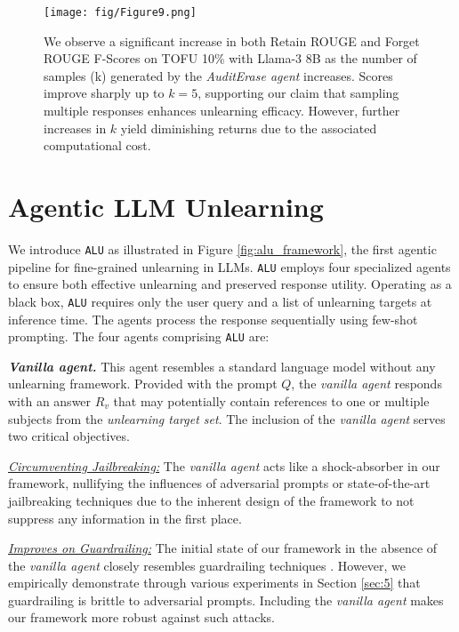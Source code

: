 
\begin{figure}[t]
    \centering
    \texttt{[image: fig/Figure9.png]}
    \caption{We observe a significant increase in both Retain ROUGE and Forget ROUGE F-Scores on TOFU 10\% with Llama-3 8B as the number of samples (k) generated by the \emph{AuditErase agent} increases. Scores improve sharply up to $k=5$, supporting our claim that sampling multiple responses enhances unlearning efficacy. However, further increases in $k$ yield diminishing returns due to the associated computational cost.}
    \label{fig:f9}
    \vspace{-1\baselineskip}
\end{figure}

\section{Agentic LLM Unlearning}
\label{sec:4}
We introduce \texttt{ALU} as illustrated in Figure \ref{fig:alu_framework}, the first agentic pipeline for fine-grained unlearning in LLMs.  \texttt{ALU} employs four specialized agents to ensure both effective unlearning and preserved response utility.  Operating as a black box, \texttt{ALU} requires only the user query and a list of unlearning targets at inference time.  The agents process the response sequentially using few-shot prompting.  The four agents comprising \texttt{ALU} are:

 \textbf{\emph{Vanilla agent.}} This agent resembles a standard language model without any unlearning framework. Provided with the prompt $Q$, the \emph{vanilla agent} responds with an answer $R_v$ that may potentially contain references to one or multiple subjects from the \emph{unlearning target set}. The inclusion of the \emph{vanilla agent} serves two critical objectives. 

\underline{\textit{Circumventing Jailbreaking:}} The \emph{vanilla agent} acts like a shock-absorber in our framework, nullifying the influences of adversarial prompts \cite{lynch2024eight} or state-of-the-art jailbreaking techniques \cite{anil2024many} due to the inherent design of the framework to not suppress any information in the first place.

\underline{\textit{Improves on Guardrailing:}} The initial state of our framework in the absence of the \emph{vanilla agent} closely resembles guardrailing techniques \cite{thaker2024guardrail}. However, we empirically demonstrate through various experiments in Section \ref{sec:5} that guardrailing is brittle to adversarial prompts. Including the \emph{vanilla agent} makes our framework more robust against such attacks. 


